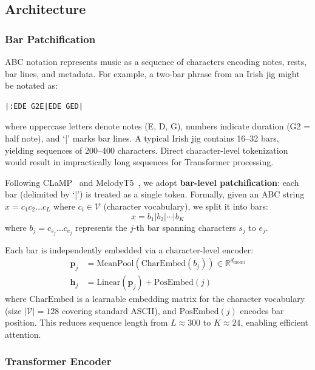 \documentclass[]{interact}
\theoremstyle{plain}
\theoremstyle{definition}
\theoremstyle{remark}
\begin{document}
\subsection{Architecture}

\subsubsection{Bar Patchification}

ABC notation represents music as a sequence of characters encoding notes, rests, bar lines, and metadata. For example, a two-bar phrase from an Irish jig might be notated as:
\begin{verbatim}
|:EDE G2E|EDE GED|
\end{verbatim}
where uppercase letters denote notes (E, D, G), numbers indicate duration (G2 = half note), and `|' marks bar lines. A typical Irish jig contains 16--32 bars, yielding sequences of 200--400 characters. Direct character-level tokenization would result in impractically long sequences for Transformer processing.

Following CLaMP~\cite{CLaMP2023} and MelodyT5~\cite{MelodyT5_2024}, we adopt \textbf{bar-level patchification}: each bar (delimited by `|') is treated as a single token. Formally, given an ABC string $x = c_1 c_2 \ldots c_L$ where $c_i \in \mathcal{V}$ (character vocabulary), we split it into bars:
\begin{equation}
x = b_1 | b_2 | \cdots | b_K
\end{equation}
where $b_j = c_{s_j} \ldots c_{e_j}$ represents the $j$-th bar spanning characters $s_j$ to $e_j$.

Each bar is independently embedded via a character-level encoder:
\begin{align}
\mathbf{p}_j &= \text{MeanPool}\left(\text{CharEmbed}(b_j)\right) \in \mathbb{R}^{d_\text{model}} \\
\mathbf{h}_j &= \text{Linear}(\mathbf{p}_j) + \text{PosEmbed}(j)
\end{align}
where $\text{CharEmbed}$ is a learnable embedding matrix for the character vocabulary (size $|\mathcal{V}| = 128$ covering standard ASCII), and $\text{PosEmbed}(j)$ encodes bar position. This reduces sequence length from $L \approx 300$ to $K \approx 24$, enabling efficient attention.

\subsubsection{Transformer Encoder}
\end{document}
